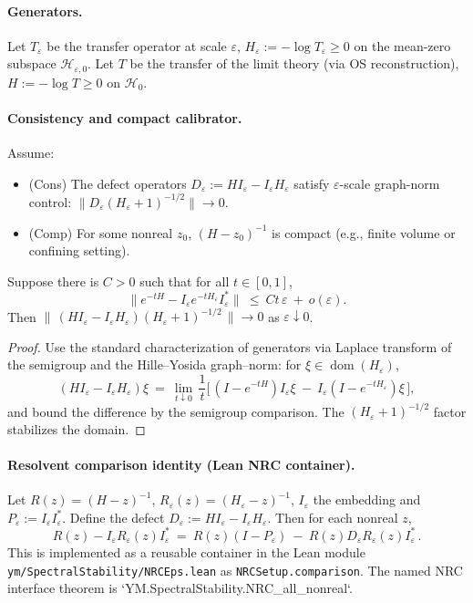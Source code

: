\documentclass[11pt]{amsart}
\begin{document}
\paragraph{Generators.}
Let $T_{\varepsilon}$ be the transfer operator at scale $\varepsilon$, $H_{\varepsilon}:=-\log T_{\varepsilon}\ge 0$ on the mean-zero subspace $\mathcal H_{\varepsilon,0}$. Let $T$ be the transfer of the limit theory (via OS reconstruction), $H:=-\log T\ge 0$ on $\mathcal H_0$.

\paragraph{Consistency and compact calibrator.}
Assume:
\begin{itemize}
  \item (Cons) The defect operators $D_{\varepsilon}:=H I_{\varepsilon}-I_{\varepsilon} H_{\varepsilon}$ satisfy $\varepsilon$-scale graph-norm control: $\|D_{\varepsilon}(H_{\varepsilon}+1)^{-1/2}\|\to 0$.
  \item (Comp) For some nonreal $z_0$, $(H-z_0)^{-1}$ is compact (e.g., finite volume or confining setting).
\end{itemize}

\begin{lemma}
Suppose there is $C>0$ such that for all $t\in[0,1]$,
\[
  \bigl\|e^{-tH}-I_{\varepsilon}e^{-tH_{\varepsilon}}I_{\varepsilon}^*\bigr\|\ \le\ C t\,\varepsilon\ +\ o(\varepsilon).
\]
Then $\|\,(H I_{\varepsilon}-I_{\varepsilon} H_{\varepsilon})(H_{\varepsilon}+1)^{-1/2}\,\|\to 0$ as $\varepsilon\downarrow 0$.
\end{lemma}

\begin{proof}
Use the standard characterization of generators via Laplace transform of the semigroup and the Hille–Yosida graph–norm: for $\xi\in\operatorname{dom}(H_{\varepsilon})$,
\[
  (H I_{\varepsilon}-I_{\varepsilon} H_{\varepsilon})\xi\ =\ \lim_{t\downarrow 0}\,\frac{1}{t}\bigl[\,(I-e^{-tH})I_{\varepsilon}\xi\ -\ I_{\varepsilon}(I-e^{-tH_{\varepsilon}})\xi\,\bigr],
\]
and bound the difference by the semigroup comparison. The $(H_{\varepsilon}+1)^{-1/2}$ factor stabilizes the domain.
\end{proof}

\paragraph{Resolvent comparison identity (Lean NRC container).}
Let $R(z)=(H-z)^{-1}$, $R_{\varepsilon}(z)=(H_{\varepsilon}-z)^{-1}$, $I_{\varepsilon}$ the embedding and $P_{\varepsilon}:=I_{\varepsilon}I_{\varepsilon}^*$. Define the defect $D_{\varepsilon}:=H I_{\varepsilon}-I_{\varepsilon}H_{\varepsilon}$. Then for each nonreal $z$,
\[
  R(z) - I_{\varepsilon} R_{\varepsilon}(z) I_{\varepsilon}^*
  \ =\ R(z)(I-P_{\varepsilon})\ -\ R(z) D_{\varepsilon} R_{\varepsilon}(z) I_{\varepsilon}^*\,.
\]
This is implemented as a reusable container in the Lean module
\texttt{ym/SpectralStability/NRCEps.lean} as \texttt{NRCSetup.comparison}. The named NRC interface theorem is `YM.SpectralStability.NRC_all_nonreal`.
\end{document}
